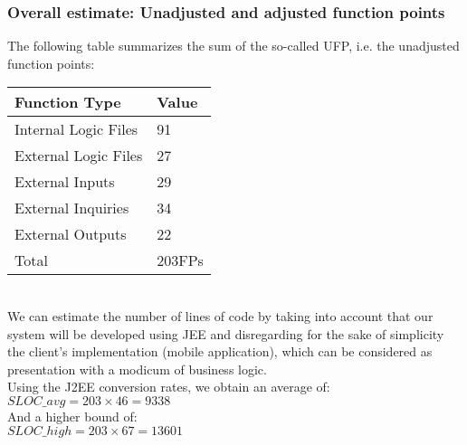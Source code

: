 \subsubsection{Overall estimate: Unadjusted and adjusted function points}
The following table summarizes the sum of the so-called UFP, i.e. the unadjusted function points:\\

	\begin{tabular}{|l|l|}
		\hline
		\textbf{Function Type} & \textbf{Value}\\ \hline
		Internal Logic Files & 91\\
		External Logic Files & 27\\
		External Inputs & 29\\
		External Inquiries & 34\\
		External Outputs & 22\\ \hline
		Total & 203FPs\\ \hline
	\end{tabular}\\
	
We can estimate the number of lines of code by taking into account that our system will be developed using JEE and disregarding for the sake of simplicity the client's implementation (mobile application), which can be considered as presentation with a modicum of business logic. \\
Using the J2EE conversion rates, we obtain an average of: \\

$SLOC\_avg = 203 \times 46 = 9338$\\

And a higher bound of:\\

$SLOC\_high = 203 \times 67 = 13601$